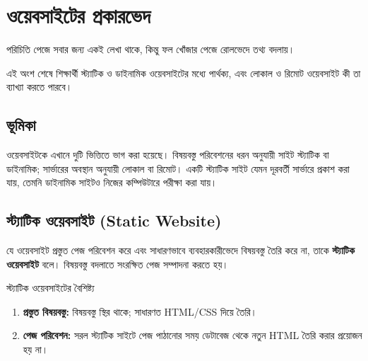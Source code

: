 \section{ওয়েবসাইটের প্রকারভেদ}

পরিচিতি পেজে সবার জন্য একই লেখা থাকে, কিন্তু ফল খোঁজার পেজে রোলভেদে তথ্য বদলায়।



\begin{learningbox}
এই অংশ শেষে শিক্ষার্থী স্ট্যাটিক ও ডাইনামিক ওয়েবসাইটের মধ্যে পার্থক্য, এবং লোকাল ও রিমোট ওয়েবসাইট কী তা ব্যাখ্যা করতে পারবে।
\end{learningbox}

\subsection{ভূমিকা}
ওয়েবসাইটকে এখানে দুটি ভিত্তিতে ভাগ করা হয়েছে। বিষয়বস্তু পরিবেশনের ধরন অনুযায়ী সাইট স্ট্যাটিক বা ডাইনামিক; সার্ভারের অবস্থান অনুযায়ী লোকাল বা রিমোট। একটি স্ট্যাটিক সাইট যেমন দূরবর্তী সার্ভারে প্রকাশ করা যায়, তেমনি ডাইনামিক সাইটও নিজের কম্পিউটারে পরীক্ষা করা যায়।

\subsection{স্ট্যাটিক ওয়েবসাইট (Static Website)}
\begin{definitionbox}{}
যে ওয়েবসাইট প্রস্তুত পেজ পরিবেশন করে এবং সাধারণভাবে ব্যবহারকারীভেদে বিষয়বস্তু তৈরি করে না, তাকে \textbf{স্ট্যাটিক ওয়েবসাইট} বলে। বিষয়বস্তু বদলাতে সংরক্ষিত পেজ সম্পাদনা করতে হয়।
\end{definitionbox}

\begin{keypointbox}{স্ট্যাটিক ওয়েবসাইটের বৈশিষ্ট্য}
\begin{enumerate}
\item \textbf{প্রস্তুত বিষয়বস্তু:} বিষয়বস্তু স্থির থাকে; সাধারণত HTML/CSS দিয়ে তৈরি।
\item \textbf{পেজ পরিবেশন:} সরল স্ট্যাটিক সাইটে পেজ পাঠানোর সময় ডেটাবেজ থেকে নতুন HTML তৈরি করার প্রয়োজন হয় না।
\end{enumerate}
\end{keypointbox}
